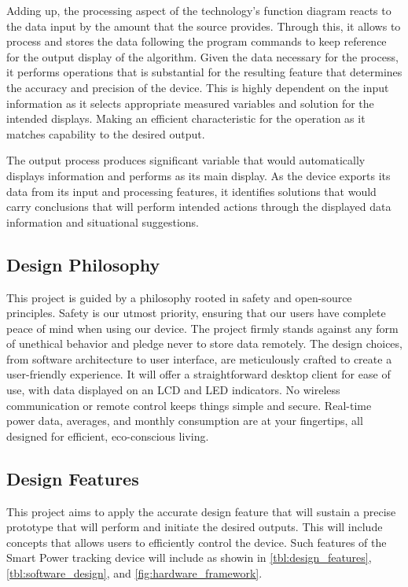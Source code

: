 \documentclass[conference, a4paper]{IEEEtran}
\begin{document}
Adding up, the processing aspect of the technology’s function diagram reacts to the data input by the amount that the source provides. Through this, it allows to process and stores the data following the program commands to keep reference for the output display of the algorithm. Given the data necessary for the process, it performs operations that is substantial for the resulting feature that determines the accuracy and precision of the device. This is highly dependent on the input information as it selects appropriate measured variables and solution for the intended displays. Making an efficient characteristic for the operation as it matches capability to the desired output.

The output process produces significant variable that would automatically displays information and performs as its main display. As the device exports its data from its input and processing features, it identifies solutions that would carry conclusions that will perform intended actions through the displayed data information and situational suggestions.

\subsection{Design Philosophy}
This project is guided by a philosophy rooted in safety and open-source principles. Safety is our utmost priority, ensuring that our users have complete peace of mind when using our device. The project firmly stands against any form of unethical behavior and pledge never to store data remotely. The design choices, from software architecture to user interface, are meticulously crafted to create a user-friendly experience. It will offer a straightforward desktop client for ease of use, with data displayed on an LCD and LED indicators. No wireless communication or remote control keeps things simple and secure. Real-time power data, averages, and monthly consumption are at your fingertips, all designed for efficient, eco-conscious living.

\subsection{Design Features}
This project aims to apply the accurate design feature that will sustain a precise prototype that will perform and initiate the desired outputs. This will include concepts that allows users to efficiently control the device. Such features of the Smart Power tracking device will include as showin in \autoref{tbl:design_features}, \autoref{tbl:software_design}, and \autoref{fig:hardware_framework}.
\end{document}
